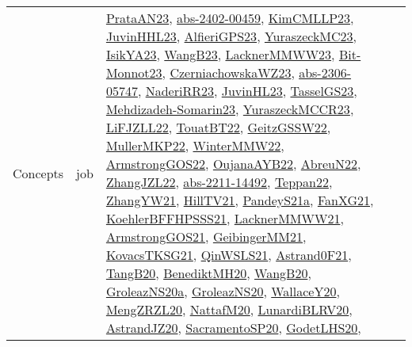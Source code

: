 {\begin{longtable}{lp{3cm}>{\raggedright}p{6cm}>{\raggedright}p{6cm}p{8cm}}
Concepts & job & \href{articles/PrataAN23.pdf}{PrataAN23}\cite{PrataAN23}, \href{articles/abs-2402-00459.pdf}{abs-2402-00459}\cite{abs-2402-00459}, \href{papers/KimCMLLP23.pdf}{KimCMLLP23}\cite{KimCMLLP23}, \href{papers/JuvinHHL23.pdf}{JuvinHHL23}\cite{JuvinHHL23}, \href{articles/AlfieriGPS23.pdf}{AlfieriGPS23}\cite{AlfieriGPS23}, \href{papers/YuraszeckMC23.pdf}{YuraszeckMC23}\cite{YuraszeckMC23}, \href{articles/IsikYA23.pdf}{IsikYA23}\cite{IsikYA23}, \href{papers/WangB23.pdf}{WangB23}\cite{WangB23}, \href{articles/LacknerMMWW23.pdf}{LacknerMMWW23}\cite{LacknerMMWW23}, \href{papers/Bit-Monnot23.pdf}{Bit-Monnot23}\cite{Bit-Monnot23}, \href{articles/CzerniachowskaWZ23.pdf}{CzerniachowskaWZ23}\cite{CzerniachowskaWZ23}, \href{articles/abs-2306-05747.pdf}{abs-2306-05747}\cite{abs-2306-05747}, \href{articles/NaderiRR23.pdf}{NaderiRR23}\cite{NaderiRR23}, \href{papers/JuvinHL23.pdf}{JuvinHL23}\cite{JuvinHL23}, \href{papers/TasselGS23.pdf}{TasselGS23}\cite{TasselGS23}, \href{papers/Mehdizadeh-Somarin23.pdf}{Mehdizadeh-Somarin23}\cite{Mehdizadeh-Somarin23}, \href{articles/YuraszeckMCCR23.pdf}{YuraszeckMCCR23}\cite{YuraszeckMCCR23}, \href{papers/LiFJZLL22.pdf}{LiFJZLL22}\cite{LiFJZLL22}, \href{papers/TouatBT22.pdf}{TouatBT22}\cite{TouatBT22}, \href{papers/GeitzGSSW22.pdf}{GeitzGSSW22}\cite{GeitzGSSW22}, \href{articles/MullerMKP22.pdf}{MullerMKP22}\cite{MullerMKP22}, \href{papers/WinterMMW22.pdf}{WinterMMW22}\cite{WinterMMW22}, \href{papers/ArmstrongGOS22.pdf}{ArmstrongGOS22}\cite{ArmstrongGOS22}, \href{papers/OujanaAYB22.pdf}{OujanaAYB22}\cite{OujanaAYB22}, \href{articles/AbreuN22.pdf}{AbreuN22}\cite{AbreuN22}, \href{papers/ZhangJZL22.pdf}{ZhangJZL22}\cite{ZhangJZL22}, \href{articles/abs-2211-14492.pdf}{abs-2211-14492}\cite{abs-2211-14492}, \href{papers/Teppan22.pdf}{Teppan22}\cite{Teppan22}, \href{articles/ZhangYW21.pdf}{ZhangYW21}\cite{ZhangYW21}, \href{papers/HillTV21.pdf}{HillTV21}\cite{HillTV21}, \href{articles/PandeyS21a.pdf}{PandeyS21a}\cite{PandeyS21a}, \href{articles/FanXG21.pdf}{FanXG21}\cite{FanXG21}, \href{articles/KoehlerBFFHPSSS21.pdf}{KoehlerBFFHPSSS21}\cite{KoehlerBFFHPSSS21}, \href{papers/LacknerMMWW21.pdf}{LacknerMMWW21}\cite{LacknerMMWW21}, \href{papers/ArmstrongGOS21.pdf}{ArmstrongGOS21}\cite{ArmstrongGOS21}, \href{papers/GeibingerMM21.pdf}{GeibingerMM21}\cite{GeibingerMM21}, \href{papers/KovacsTKSG21.pdf}{KovacsTKSG21}\cite{KovacsTKSG21}, \href{articles/QinWSLS21.pdf}{QinWSLS21}\cite{QinWSLS21}, \href{papers/Astrand0F21.pdf}{Astrand0F21}\cite{Astrand0F21}, \href{papers/TangB20.pdf}{TangB20}\cite{TangB20}, \href{articles/BenediktMH20.pdf}{BenediktMH20}\cite{BenediktMH20}, \href{papers/WangB20.pdf}{WangB20}\cite{WangB20}, \href{papers/GroleazNS20a.pdf}{GroleazNS20a}\cite{GroleazNS20a}, \href{papers/GroleazNS20.pdf}{GroleazNS20}\cite{GroleazNS20}, \href{articles/WallaceY20.pdf}{WallaceY20}\cite{WallaceY20}, \href{articles/MengZRZL20.pdf}{MengZRZL20}\cite{MengZRZL20}, \href{papers/NattafM20.pdf}{NattafM20}\cite{NattafM20}, \href{articles/LunardiBLRV20.pdf}{LunardiBLRV20}\cite{LunardiBLRV20}, \href{articles/AstrandJZ20.pdf}{AstrandJZ20}\cite{AstrandJZ20}, \href{articles/SacramentoSP20.pdf}{SacramentoSP20}\cite{SacramentoSP20}, \href{papers/GodetLHS20.pdf}{GodetLHS20}\cite{GodetLHS20}, 
\end{longtable}}
